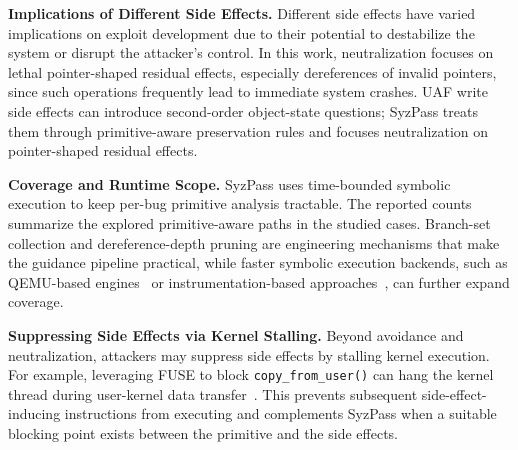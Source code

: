 \noindent\textbf{Implications of Different Side Effects.} Different side effects have varied implications on exploit development due to their potential to destabilize the system or disrupt the attacker's control. In this work, neutralization focuses on lethal pointer-shaped residual effects, especially dereferences of invalid pointers, since such operations frequently lead to immediate system crashes. UAF write side effects can introduce second-order object-state questions; SyzPass treats them through primitive-aware preservation rules and focuses neutralization on pointer-shaped residual effects.

\noindent\textbf{Coverage and Runtime Scope.} SyzPass uses time-bounded symbolic execution to keep per-bug primitive analysis tractable. The reported counts summarize the explored primitive-aware paths in the studied cases. Branch-set collection and dereference-depth pruning are engineering mechanisms that make the guidance pipeline practical, while faster symbolic execution backends, such as QEMU-based engines~\cite{symfit} or instrumentation-based approaches~\cite{symcc}, can further expand coverage.

\noindent\textbf{Suppressing Side Effects via Kernel Stalling.} Beyond avoidance and neutralization, attackers may suppress side effects by stalling kernel execution. For example, leveraging FUSE to block \texttt{copy\_from\_user()} can hang the kernel thread during user-kernel data transfer~\cite{fuze_exp}. This prevents subsequent side-effect-inducing instructions from executing and complements SyzPass when a suitable blocking point exists between the primitive and the side effects.

